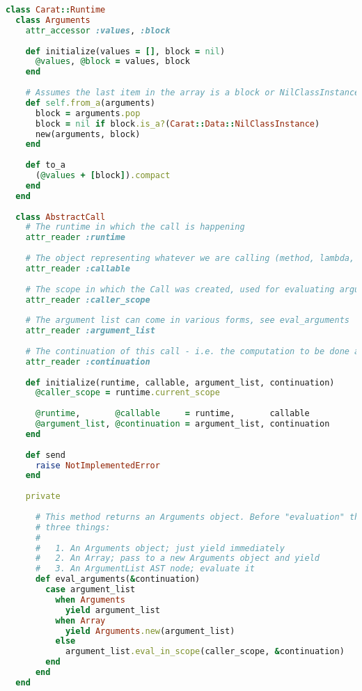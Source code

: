 \begin{lstlisting}[title={\small\ttfamily\bfseries runtime/call.rb},language=Ruby]
class Carat::Runtime
  class Arguments
    attr_accessor :values, :block
    
    def initialize(values = [], block = nil)
      @values, @block = values, block
    end
    
    # Assumes the last item in the array is a block or NilClassInstance representing no block
    def self.from_a(arguments)
      block = arguments.pop
      block = nil if block.is_a?(Carat::Data::NilClassInstance)
      new(arguments, block)
    end
    
    def to_a
      (@values + [block]).compact
    end
  end
  
  class AbstractCall
    # The runtime in which the call is happening
    attr_reader :runtime
    
    # The object representing whatever we are calling (method, lambda, primitive method, etc)
    attr_reader :callable
    
    # The scope in which the Call was created, used for evaluating arguments
    attr_reader :caller_scope
    
    # The argument list can come in various forms, see eval_arguments
    attr_reader :argument_list
    
    # The continuation of this call - i.e. the computation to be done afterwards
    attr_reader :continuation
    
    def initialize(runtime, callable, argument_list, continuation)
      @caller_scope = runtime.current_scope
      
      @runtime,       @callable     = runtime,       callable
      @argument_list, @continuation = argument_list, continuation
    end
    
    def send
      raise NotImplementedError
    end
    
    private
    
      # This method returns an Arguments object. Before "evaluation" the arguments may be one of
      # three things:
      # 
      #   1. An Arguments object; just yield immediately
      #   2. An Array; pass to a new Arguments object and yield
      #   3. An ArgumentList AST node; evaluate it
      def eval_arguments(&continuation)
        case argument_list
          when Arguments
            yield argument_list
          when Array
            yield Arguments.new(argument_list)
          else
            argument_list.eval_in_scope(caller_scope, &continuation)
        end
      end
  end
  

\end{lstlisting}
